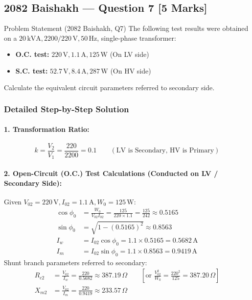 \documentclass[11pt,a4paper,oneside]{article}
\begin{document}
\newpage

\subsection{2082 Baishakh --- Question 7 [5 Marks]}

\begin{questionbox}{Problem Statement (2082 Baishakh, Q7)}
The following test results were obtained on a $20\,\mathrm{kVA}, 2200/220\,\mathrm{V}, 50\,\mathrm{Hz}$, single-phase transformer:
\begin{itemize}
  \item \textbf{O.C. test:} $220\,\mathrm{V}, 1.1\,\mathrm{A}, 125\,\mathrm{W}$ (On LV side)
  \item \textbf{S.C. test:} $52.7\,\mathrm{V}, 8.4\,\mathrm{A}, 287\,\mathrm{W}$ (On HV side)
\end{itemize}
Calculate the equivalent circuit parameters referred to secondary side.
\end{questionbox}

\subsubsection*{Detailed Step-by-Step Solution}
\paragraph{1. Transformation Ratio:}
\[
k = \frac{V_2}{V_1} = \frac{220}{2200} = 0.1 \qquad (\text{LV is Secondary, HV is Primary})
\]

\paragraph{2. Open-Circuit (O.C.) Test Calculations (Conducted on LV / Secondary Side):}
Given $V_{02} = 220\,\mathrm{V}, I_{02} = 1.1\,\mathrm{A}, W_0 = 125\,\mathrm{W}$:
\begin{align*}
  \cos\phi_0 &= \frac{W_0}{V_{02} I_{02}} = \frac{125}{220 \times 1.1} = \frac{125}{242} \approx 0.5165 \\
  \sin\phi_0 &= \sqrt{1 - (0.5165)^2} \approx 0.8563 \\
  I_w &= I_{02}\cos\phi_0 = 1.1 \times 0.5165 = 0.5682\,\mathrm{A} \\
  I_m &= I_{02}\sin\phi_0 = 1.1 \times 0.8563 = 0.9419\,\mathrm{A}
\end{align*}
Shunt branch parameters referred to secondary:
\begin{align}
  R_{c2} &= \frac{V_{02}}{I_w} = \frac{220}{0.5682} \approx 387.19\,\Omega \qquad \left[\text{or } \frac{V_{02}^2}{W_0} = \frac{220^2}{125} = 387.20\,\Omega\right] \\
  X_{m2} &= \frac{V_{02}}{I_m} = \frac{220}{0.9419} \approx 233.57\,\Omega
\end{align}
\end{document}
